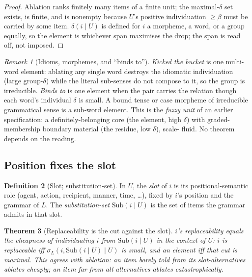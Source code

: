 \documentclass[11pt,a4paper]{article}
\theoremstyle{thmstyle}
\newtheorem{theorem}{Theorem}[section]
\theoremstyle{definition}
\newtheorem{definition}[theorem]{Definition}
\theoremstyle{remark}
\newtheorem{remark}[theorem]{Remark}
\newcommand{\Lang}{L}
\newcommand{\flo}{\beta}               %
\newcommand{\str}{\sigma}              %
\newcommand{\abl}{\delta}              %
\begin{document}
\begin{proof}
Ablation ranks finitely many items of a finite unit; the maximal-$\abl$ set
exists, is finite, and is nonempty because $U$'s positive individuation
$\ge\flo$ must be carried by some item. $\abl(i\mid U)$ is defined for $i$ a
morpheme, a word, or a group equally, so the element is whichever span
maximises the drop; the span is read off, not imposed.
\end{proof}

\begin{remark}[Idioms, morphemes, and ``binds to'']
\label{rem:grain}
\emph{Kicked the bucket} is one multi-word element: ablating any single word
destroys the idiomatic individuation (large group-$\abl$) while the literal
sub-senses do not compose to it, so the group is irreducible. \emph{Binds to}
is one element when the pair carries the relation though each word's
individual $\abl$ is small. A bound tense or case morpheme of irreducible
grammatical sense is a sub-word element. This is the \emph{fuzzy unit} of an
earlier specification: a definitely-belonging core (the element, high $\abl$)
with graded-membership boundary material (the residue, low $\abl$), scale-
fluid. No theorem depends on the reading.
\end{remark}

\subsection{Position fixes the slot}

\begin{definition}[Slot; substitution-set]
\label{def:slot}
In $U$, the \emph{slot} of $i$ is its positional-semantic role (agent,
action, recipient, manner, time, \dots), fixed by $i$'s position and the
grammar of $\Lang$. The \emph{substitution-set} $\mathrm{Sub}(i\mid U)$ is
the set of items the grammar admits in that slot.
\end{definition}

\begin{theorem}[Replaceability is the cut against the slot]
\label{thm:slot}
$i$'s replaceability equals the cheapness of individuating $i$ from
$\mathrm{Sub}(i\mid U)$ in the context of $U$: $i$ is replaceable iff
$\str_\Lang(i,\mathrm{Sub}(i\mid U)\mid U)$ is small, and an element iff that
cut is maximal. This agrees with ablation: an item barely told from its
slot-alternatives ablates cheaply; an item far from all alternatives ablates
catastrophically.
\end{theorem}
\end{document}
